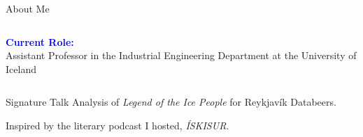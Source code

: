 \begin{frame}{About Me}
\begin{columns}[T]
  \begin{column}{0.35\textwidth} %
    \textcolor{blue}{\textbf{Current Role:}}\\
    Assistant Professor in the Industrial Engineering Department at the University of Iceland
  \end{column}
\end{columns}

  \vfill
  \begin{block}{Signature Talk}
      Analysis of \emph{Legend of the Ice People} for Reykjavík Databeers.

      \vspace{0.5em}

      Inspired by the literary podcast I hosted, \emph{ÍSKISUR}.
  \end{block}
\end{frame}


